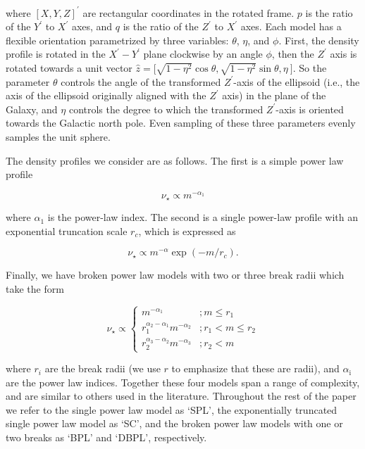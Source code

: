 \noindent where $[X,Y,Z]^{\prime}$ are rectangular coordinates in the rotated frame. $p$ is the ratio of the $Y^{\prime}$ to $X^{\prime}$ axes, and $q$ is the ratio of the $Z^{\prime}$ to $X^{\prime}$ axes. Each model has a flexible orientation parametrized by three variables: $\theta$, $\eta$, and $\phi$. First, the density profile is rotated in the $X^{\prime}-Y^{\prime}$ plane clockwise by an angle $\phi$, then the $Z^{\prime}$ axis is rotated towards a unit vector $\hat{z} = \big[ \sqrt{ 1-\eta^{2} } \cos\theta, \sqrt{ 1-\eta^{2} } \sin\theta, \eta \  \big]$. So the parameter $\theta$ controls the angle of the transformed $Z^{\prime}$-axis of the ellipsoid (i.e., the axis of the ellipsoid originally aligned with the $Z^{\prime}$ axis) in the plane of the Galaxy, and $\eta$ controls the degree to which the transformed $Z^{\prime}$-axis is oriented towards the Galactic north pole. Even sampling of these three parameters evenly samples the unit sphere. 

The density profiles we consider are as follows. The first is a simple power law profile

\begin{equation}
\label{ch3:eq:single-power-law}
\nu_{\star} \propto m^{-\alpha_{1}}
\end{equation}

\noindent where $\alpha_{1}$ is the power-law index. The second is a single power-law profile with an exponential truncation scale $r_{c}$, which is expressed as 

\begin{equation}
\label{ch3:eq:exp-truncated-power-law}
\nu_{\star} \propto m^{-\alpha} \exp(-m/r_{c}) .
\end{equation}

\noindent Finally, we have broken power law models with two or three break radii which take the form

\begin{equation}
\label{ch3:eq:broken-power-law}
\nu_{\star} \propto 
\begin{cases}
m^{-\alpha_{1}} & ; m \leq r_{1} \\
r_{1}^{\alpha_{2}-\alpha_{1}} m^{-\alpha_{2}} & ; r_{1} < m \leq r_{2} \\
r_{2}^{\alpha_{3}-\alpha_{2}} m^{-\alpha_{3}} & ; r_{2} < m
\end{cases}
\end{equation}


\noindent where $r_i$ are the break radii (we use $r$ to emphasize that these are radii), and $\alpha_\mathrm{i}$ are the power law indices. Together these four models span a range of complexity, and are similar to others used in the literature. Throughout the rest of the paper we refer to the single power law model as `SPL', the exponentially truncated single power law model as `SC', and the broken power law models with one or two breaks as `BPL' and `DBPL', respectively.

